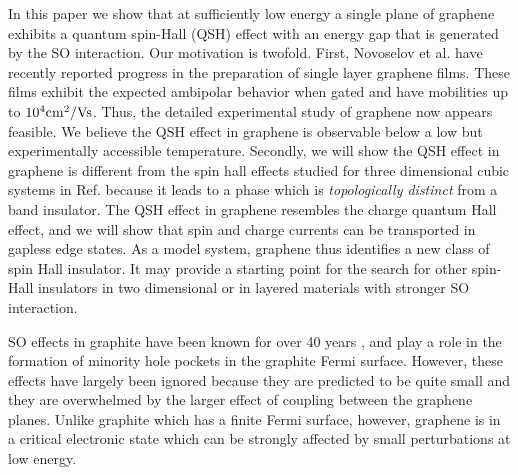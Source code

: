 \documentclass[twocolumn,showpacs,floatfix,prl]{revtex4}
\begin{document}
In this paper we show that at sufficiently low energy a single
plane of graphene exhibits a quantum spin-Hall (QSH) effect with an
energy gap that is generated by the SO interaction. Our
motivation is twofold. First, Novoselov et al.\cite{novoselov}
have recently reported progress in the preparation of single
layer graphene films.  These films exhibit the expected ambipolar
behavior when gated and have mobilities up to $10^4 {\rm
cm}^2/{\rm Vs}$. Thus, the detailed experimental study of
graphene now appears feasible.  We believe the QSH effect
in graphene is observable below a low but experimentally
accessible temperature. Secondly, we will show the QSH
effect in graphene is different from the spin hall effects
studied for three dimensional cubic systems in Ref.
 because it leads to a phase which is
{\it topologically distinct} from a band insulator. The QSH effect in graphene
resembles the charge quantum Hall effect, and we
will show that spin and charge currents can be transported in
gapless edge states.  As a model system, graphene thus identifies
a new class of spin Hall insulator. It may provide a starting
point for the search for other spin-Hall insulators in two
dimensional or in layered materials with stronger SO
interaction.

SO effects in graphite have been known for over 40 years
\cite{dresselhaus}, and play a role in the formation of minority
hole pockets in the graphite Fermi surface\cite{review}. However,
these effects have largely been ignored because they are
predicted to be quite small and they are overwhelmed by the
larger effect of coupling between the graphene
planes.  Unlike graphite which has a finite Fermi surface,
however, graphene is in a critical electronic state which can be
strongly affected by small perturbations at low energy.
\end{document}
